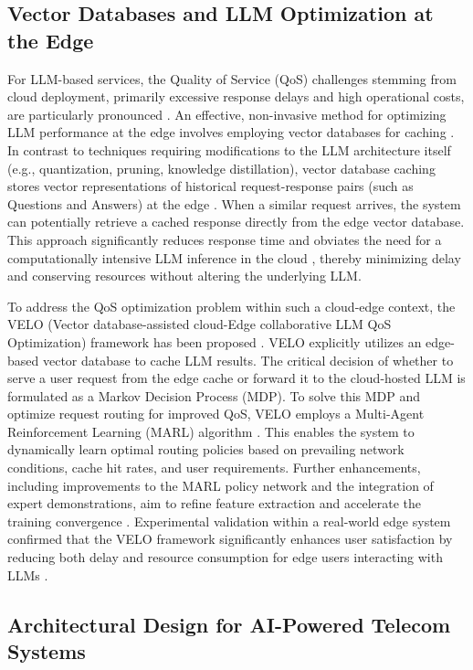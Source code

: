 \documentclass[sigconf]{acmart}
\begin{document}
\subsection{Vector Databases and LLM Optimization at the Edge}

For LLM-based services, the Quality of Service (QoS) challenges stemming from cloud deployment, primarily excessive response delays and high operational costs, are particularly pronounced \cite{ref14}. An effective, non-invasive method for optimizing LLM performance at the edge involves employing vector databases for caching \cite{ref14}. In contrast to techniques requiring modifications to the LLM architecture itself (e.g., quantization, pruning, knowledge distillation), vector database caching stores vector representations of historical request-response pairs (such as Questions and Answers) at the edge \cite{ref14}. When a similar request arrives, the system can potentially retrieve a cached response directly from the edge vector database. This approach significantly reduces response time and obviates the need for a computationally intensive LLM inference in the cloud \cite{ref14}, thereby minimizing delay and conserving resources without altering the underlying LLM.

To address the QoS optimization problem within such a cloud-edge context, the VELO (Vector database-assisted cloud-Edge collaborative LLM QoS Optimization) framework has been proposed \cite{ref14}. VELO explicitly utilizes an edge-based vector database to cache LLM results. The critical decision of whether to serve a user request from the edge cache or forward it to the cloud-hosted LLM is formulated as a Markov Decision Process (MDP). To solve this MDP and optimize request routing for improved QoS, VELO employs a Multi-Agent Reinforcement Learning (MARL) algorithm \cite{ref14}. This enables the system to dynamically learn optimal routing policies based on prevailing network conditions, cache hit rates, and user requirements. Further enhancements, including improvements to the MARL policy network and the integration of expert demonstrations, aim to refine feature extraction and accelerate the training convergence \cite{ref14}. Experimental validation within a real-world edge system confirmed that the VELO framework significantly enhances user satisfaction by reducing both delay and resource consumption for edge users interacting with LLMs \cite{ref14}.

\subsection{Architectural Design for AI-Powered Telecom Systems}
\end{document}
